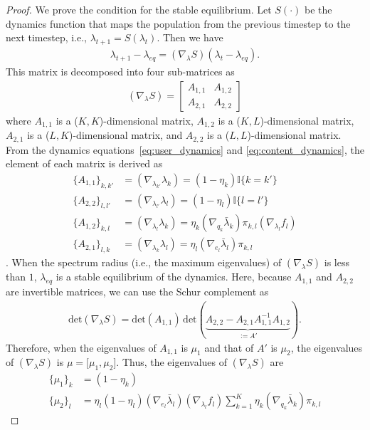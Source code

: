 \begin{proof}
We prove the condition for the stable equilibrium. Let $S(\cdot)$ be the dynamics function that maps the population from the previous timestep to the next timestep, i.e., $\lambda_{t+1} = S(\lambda_{t})$. Then we have
\begin{align*}
    \lambda_{t+1} - \lambda_{eq} = (\nabla_{\lambda} S) (\lambda_{t} - \lambda_{eq}).
\end{align*}
This matrix is decomposed into four sub-matrices as 
\begin{align*}
    (\nabla_{\lambda} S) = \begin{bmatrix}
    A_{1,1} & A_{1,2} \\
    A_{2,1} & A_{2,2}
\end{bmatrix}
\end{align*}
where $A_{1,1}$ is a ($K, K$)-dimensional matrix, $A_{1,2}$ is a ($K, L$)-dimensional matrix, $A_{2,1}$ is a ($L, K$)-dimensional matrix, and $A_{2,2}$ is a ($L, L$)-dimensional matrix. From the dynamics equations~\ref{eq:user_dynamics} and \ref{eq:content_dynamics}, the element of each matrix is derived as
\begin{align*}
    \{A_{1,1}\}_{k,k'} 
    &= (\nabla_{\lambda_{k'}} \lambda_k) 
    = (1 - \eta_k) \mathbb{I} \{ k = k' \} \\
    \{A_{2,2}\}_{l,l'} 
    &= (\nabla_{\lambda_{l'}} \lambda_l) 
    = (1 - \eta_l) \mathbb{I} \{ l = l' \} \\
    \{A_{1,2}\}_{k,l} 
    &= (\nabla_{\lambda_{l}} \lambda_k) 
    = \eta_k (\nabla_{q_k} \bar{\lambda}_k) \pi_{k,l} (\nabla_{\lambda_l} f_l) \\
    \{A_{2,1}\}_{l,k} 
    &= (\nabla_{\lambda_{k}} \lambda_l) 
    = \eta_l (\nabla_{e_l} \bar{\lambda}_l) \pi_{k,l}
\end{align*}.
When the spectrum radius (i.e., the maximum eigenvalues) of $(\nabla_{\lambda} S)$ is less than $1$, $\lambda_{eq}$ is a stable equilibrium of the dynamics. Here, because $A_{1,1}$ and $A_{2,2}$ are invertible matrices, we can use the Schur complement as
\begin{align*}
    \mathrm{det}(\nabla_{\lambda}S) = \mathrm{det}(A_{1,1}) \, \mathrm{det}(\underbrace{A_{2,2} - A_{2,1} A_{1,1}^{-1} A_{1,2}}_{:=A'}).
\end{align*}
Therefore, when the eigenvalues of $A_{1,1}$ is $\mu_1$ and that of $A'$ is $\mu_2$, 
the eigenvalues of $(\nabla_{\lambda} S)$ is $\mu = [\mu_1, \mu_2$]. Thus, the eigenvalues of $(\nabla_{\lambda} S)$ are
\begin{align*}
    \{\mu_{1}\}_k &= (1 - \eta_k) \\
    \{\mu_{2}\}_l &= \eta_l (1 - \eta_l) (\nabla_{e_l} \bar{\lambda}_l) (\nabla_{\lambda_l} f_l) \sum_{k=1}^{K} \eta_{k} (\nabla_{q_k} \bar{\lambda}_k) \pi_{k,l}
\end{align*}
\end{proof}

